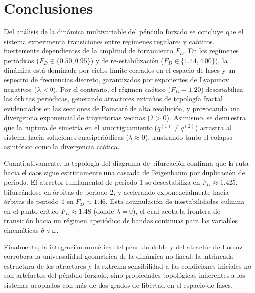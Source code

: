 \section{Conclusiones}

Del análisis de la dinámica multivariable del péndulo forzado se concluye que el sistema experimenta transiciones entre regímenes regulares y caóticos, fuertemente dependientes de la amplitud de forzamiento $F_D$. En los regímenes periódicos ($F_D \in \{0.50, 0.95\}$) y de re-estabilización ($F_D \in \{1.44, 4.00\}$), la dinámica está dominada por ciclos límite cerrados en el espacio de fases y un espectro de frecuencias discreto, garantizados por exponentes de Lyapunov negativos ($\lambda < 0$). Por el contrario, el régimen caótico ($F_D = 1.20$) desestabiliza las órbitas periódicas, generando atractores extraños de topología fractal evidenciados en las secciones de Poincaré de alta resolución, y provocando una divergencia exponencial de trayectorias vecinas ($\lambda > 0$). Asimismo, se demuestra que la ruptura de simetría en el amortiguamiento ($q^{(1)} \neq q^{(2)}$) arrastra al sistema hacia soluciones cuasiperiódicas ($\lambda \approx 0$), frustrando tanto el colapso asintótico como la divergencia caótica.

Cuantitativamente, la topología del diagrama de bifurcación confirma que la ruta hacia el caos sigue estrictamente una cascada de Feigenbaum por duplicación de periodo. El atractor fundamental de periodo 1 se desestabiliza en $F_D \approx 1.425$, bifurcándose en órbitas de periodo 2, y acelerando exponencialmente hacia órbitas de periodo 4 en $F_D \approx 1.46$. Esta acumulación de inestabilidades culmina en el punto crítico $F_D \approx  1.48$ (donde $\lambda = 0$), el cual acota la frontera de transición hacia un régimen aperiódico de bandas continuas para las variables cinemáticas $\theta$ y $\omega$.

Finalmente, la integración numérica del péndulo doble y del atractor de Lorenz corrobora la universalidad geométrica de la dinámica no lineal: la intrincada estructura de los atractores y la extrema sensibilidad a las condiciones iniciales no son artefactos del péndulo forzado, sino propiedades topológicas inherentes a los sistemas acoplados con más de dos grados de libertad en el espacio de fases.